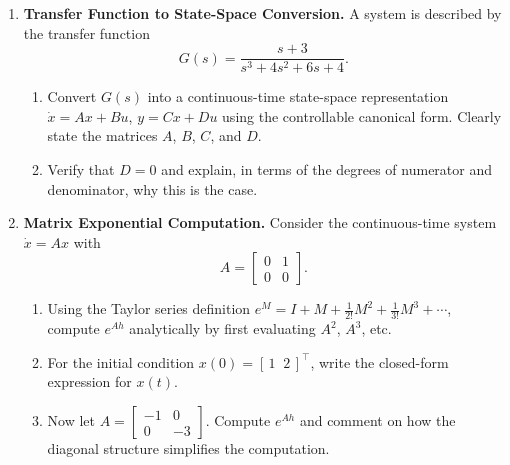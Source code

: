 \begin{enumerate}

\item \textbf{Transfer Function to State-Space Conversion.}
A system is described by the transfer function
\[
G(s) = \frac{s + 3}{s^3 + 4s^2 + 6s + 4}.
\]
\begin{enumerate}
	\item[(a)] Convert $G(s)$ into a continuous-time state-space representation $\dot{x} = Ax + Bu$, $y = Cx + Du$ using the controllable canonical form. Clearly state the matrices $A$, $B$, $C$, and $D$.
	\item[(b)] Verify that $D = 0$ and explain, in terms of the degrees of numerator and denominator, why this is the case.
\end{enumerate}

\item \textbf{Matrix Exponential Computation.}
Consider the continuous-time system $\dot{x} = Ax$ with
\[
A = \begin{bmatrix} 0 & 1 \\ 0 & 0 \end{bmatrix}.
\]
\begin{enumerate}
	\item[(a)] Using the Taylor series definition $e^{M} = I + M + \frac{1}{2!}M^2 + \frac{1}{3!}M^3 + \cdots$, compute $e^{Ah}$ analytically by first evaluating $A^2$, $A^3$, etc.
	\item[(b)] For the initial condition $x(0) = [\,1 \;\; 2\,]^\top$, write the closed-form expression for $x(t)$.
	\item[(c)] Now let $A = \begin{bmatrix} -1 & 0 \\ 0 & -3 \end{bmatrix}$. Compute $e^{Ah}$ and comment on how the diagonal structure simplifies the computation.
\end{enumerate}


\end{enumerate}
